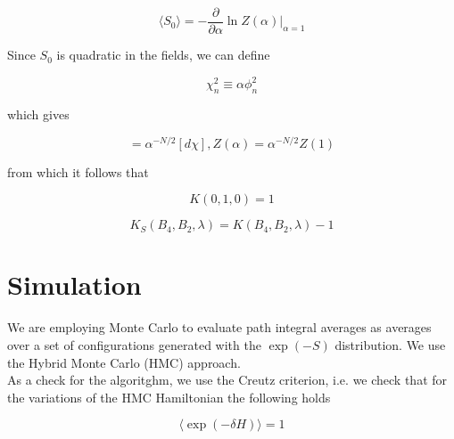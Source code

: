 \documentclass{article}
\begin{document}
\begin{equation}
\langle S_0 \rangle = -\frac{\partial}{\partial \alpha} \ln Z(\alpha) \Bigr|_{\alpha = 1}
\end{equation}

\noindent Since $S_0$ is quadratic in the fields, we can define

\begin{equation}
\chi_n^2 \equiv \alpha \phi_n^2
\end{equation}

\noindent which gives

\begin{equation}
[d\phi] = \alpha^{-N/2} [d\chi], Z(\alpha) = \alpha^{-N/2} Z(1)
\end{equation}

\noindent from which it follows that

\begin{equation}
K(0,1,0) = 1
\end{equation}

\begin{equation}
K_S(B_4, B_2, \lambda) = K(B_4, B_2, \lambda) - 1
\end{equation}

\section{Simulation}

\noindent We are employing Monte Carlo to evaluate path integral averages as averages over a set of configurations
generated with the $\exp(-S)$ distribution. We use the Hybrid Monte Carlo (HMC) approach.\\

\noindent As a check for the algoritghm, we use the Creutz criterion, i.e. we check that for the variations of the HMC Hamiltonian
the following holds

\begin{equation}
\langle \exp \left( - \delta H \right) \rangle = 1
\end{equation}
\end{document}
